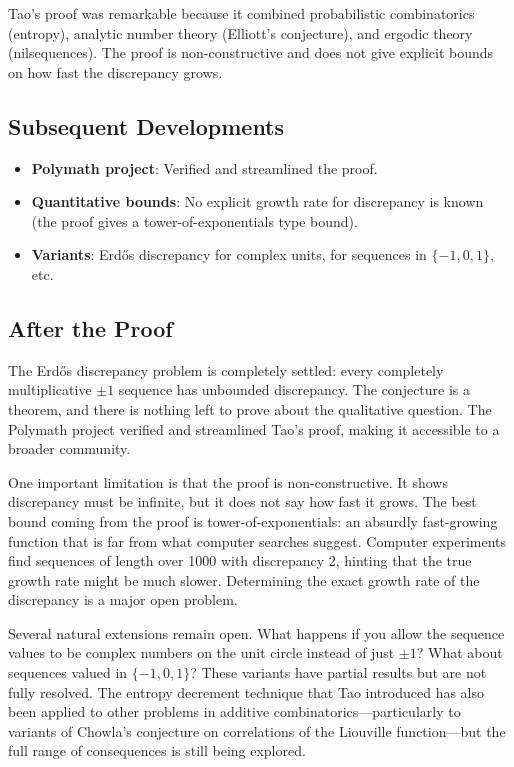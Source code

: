 \begin{highlightbox}
Tao's proof was remarkable because it combined probabilistic combinatorics (entropy), analytic number theory (Elliott's conjecture), and ergodic theory (nilsequences). The proof is non-constructive and does not give explicit bounds on how fast the discrepancy grows.
\end{highlightbox}

\subsection{Subsequent Developments}
\begin{itemize}
\item \textbf{Polymath project}: Verified and streamlined the proof.
\item \textbf{Quantitative bounds}: No explicit growth rate for discrepancy is known (the proof gives a tower-of-exponentials type bound).
\item \textbf{Variants}: Erdős discrepancy for complex units, for sequences in $\{-1,0,1\}$, etc.
\end{itemize}

\subsection{After the Proof}

The Erd\H{o}s discrepancy problem is completely settled: every completely multiplicative $\pm 1$ sequence has unbounded discrepancy. The conjecture is a theorem, and there is nothing left to prove about the qualitative question. The Polymath project verified and streamlined Tao's proof, making it accessible to a broader community.

One important limitation is that the proof is non-constructive. It shows discrepancy must be infinite, but it does not say how fast it grows. The best bound coming from the proof is tower-of-exponentials: an absurdly fast-growing function that is far from what computer searches suggest. Computer experiments find sequences of length over 1000 with discrepancy 2, hinting that the true growth rate might be much slower. Determining the exact growth rate of the discrepancy is a major open problem.

Several natural extensions remain open. What happens if you allow the sequence values to be complex numbers on the unit circle instead of just $\pm 1$? What about sequences valued in $\{-1, 0, 1\}$? These variants have partial results but are not fully resolved. The entropy decrement technique that Tao introduced has also been applied to other problems in additive combinatorics---particularly to variants of Chowla's conjecture on correlations of the Liouville function---but the full range of consequences is still being explored.

